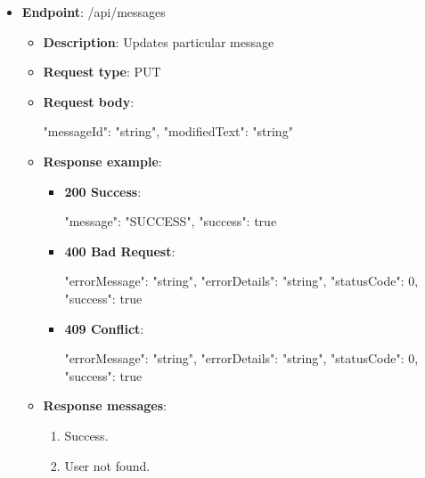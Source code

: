 \begin{itemize}
    \item \textbf{Endpoint}: /api/messages
    \begin{itemize}
        \item \textbf{Description}: Updates particular message
        \item \textbf{Request type}: PUT
        \item \textbf{Request body}:
        \begin{spverbatim}
        {
            "messageId": "string",
            "modifiedText": "string"
        }
        \end{spverbatim}
        \item \textbf{Response example}:
        \begin{itemize}
            \item \textbf{200 Success}:
            \begin{spverbatim}
            {
                "message": "SUCCESS",
                "success": true
            }
            \end{spverbatim}
            \item \textbf{400 Bad Request}:
            \begin{spverbatim}
            {
                "errorMessage": "string",
                "errorDetails": "string",
                "statusCode": 0,
                "success": true
            }
            \end{spverbatim}
            \item \textbf{409 Conflict}:
            \begin{spverbatim}
            {
                "errorMessage": "string",
                "errorDetails": "string",
                "statusCode": 0,
                "success": true
            }
            \end{spverbatim}
        \end{itemize}
        \item \textbf{Response messages}:
        \begin{enumerate}
            \item Success.
            \item User not found.
        \end{enumerate}
    \end{itemize}


\end{itemize}
